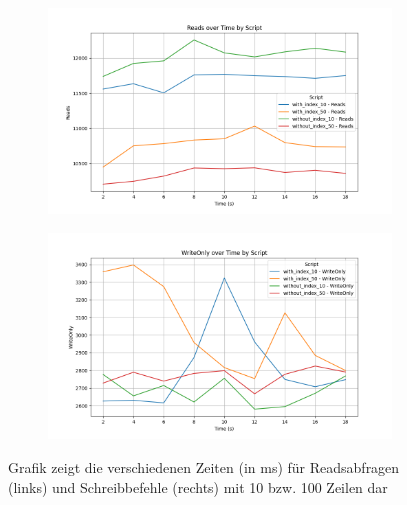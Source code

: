 \begin{figure}[!ht]
    \centering
    \begin{subfigure}[t]{0.48\textwidth}
        \centering
        \includegraphics[width=\textwidth]{PNGs/Index/B-Tree/Low_Reads}
        \label{low-reads}
    \end{subfigure}
    \hfill
    \begin{subfigure}[t]{0.48\textwidth}
        \centering
        \includegraphics[width=\textwidth]{PNGs/Index/B-Tree/Low_Writes}
        \label{low-writes}
    \end{subfigure}
    \caption[Low-Counts: Reads und Writes]{Grafik zeigt die verschiedenen Zeiten (in ms) für Readsabfragen (links) und Schreibbefehle (rechts) mit 10 bzw. 100 Zeilen dar}
    \label{fig:low-b-tree-columns}
\end{figure}

